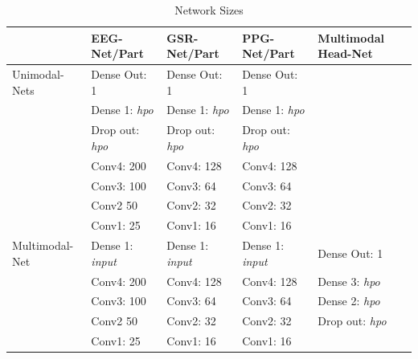 \documentclass[12pt]{article}
\begin{document}
\bgroup
\def\arraystretch{1.6}%
\begin{table}[h]
\caption{Network Sizes}
\label{table:modelvariations}
\begin{tabular}{lllll}
\hline
        & EEG-Net/Part  & GSR-Net/Part  & PPG-Net/Part  & Multimodal Head-Net     \\ \hline
 Unimodal-Nets & Dense Out: 1 & Dense Out: 1 & Dense Out: 1 &   \\
        & Dense 1: \emph{hpo} & Dense 1: \emph{hpo} & Dense 1: \emph{hpo} &   \\
        \vspace{1.5ex}        
        & Drop out: \emph{hpo} & Drop out: \emph{hpo} & Drop out: \emph{hpo} &   \\
        & Conv4: 200 & Conv4: 128 & Conv4: 128 &    \\ 
        & Conv3: 100 & Conv3: 64 & Conv3: 64 &    \\ 
        & Conv2 50 & Conv2: 32 & Conv2: 32 &    \\ 
        \vspace{3ex}
        & Conv1: 25 & Conv1: 16 & Conv1: 16 &  \\         
  Multimodal-Net & Dense 1: \emph{input} & Dense 1: \emph{input} & Dense 1: \emph{input} & Dense Out: 1  \\
        & Conv4: 200 & Conv4: 128 & Conv4: 128  &  Dense 3: \emph{hpo} \\ 
        & Conv3: 100 & Conv3: 64 & Conv3: 64 & Dense 2: \emph{hpo}  \\ 
        & Conv2 50 & Conv2: 32 & Conv2: 32 & Drop out: \emph{hpo}    \\ 
        \vspace{3ex}
        & Conv1: 25 & Conv1: 16 & Conv1: 16 &    \\   \hline
\end{tabular}
\vspace{2ex}
\begin{doublespacing}


\end{doublespacing}
\end{table}
\egroup
\restoregeometry
\end{document}
